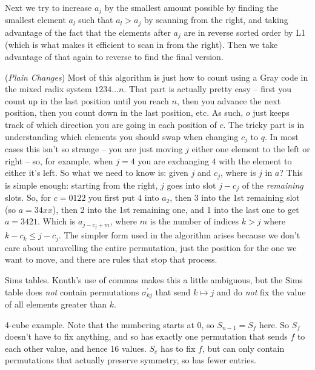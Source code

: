 Next we try to increase $a_j$ by the smallest amount possible by finding
the smallest element $a_l$ such that $a_l > a_j$ by scanning from the right,
and taking advantage of the fact that the elements after $a_j$ are in
reverse sorted order by L1 (which is what makes it efficient to scan
in from the right).  Then we take advantage of that again to reverse to find the
final version.

\vskip 0.08in
 ({\it Plain Changes})\hfil\break
Most of this algorithm is just how to count using a Gray code in the
mixed radix system $1 2 3 4 \ldots n$.  That part is actually pretty easy --
first you count up in the last position until you reach $n$, then you advance
the next position, then you count down in the last position, etc.  As such,
$o$ just keeps track of which direction you are going in each position of $c$.
The tricky part is in understanding which elements you should swap when
changing $c_j$ to $q$.  In most cases this isn't so strange -- you are just
moving $j$ either one element to the left or right -- so, for example, when 
$j = 4$ you are exchanging $4$ with the element to either it's left.  
So what we need to know is: given $j$ and $c_j$, where is $j$ in
$a$?  This is simple enough: starting from the right, $j$ goes into
slot $j - c_{j}$ of the {\it remaining} slots.  So, for $c=0122$
you first put $4$ into $a_2$, then 3 into the 1st remaining slot
(so $a = 34xx$), then 2 into the 1st remaining one, and 1 into
the last one to get $a=3421$.  Which is $a_{j - c_j + m}$,
where $m$ is the number of indices $k > j$ where 
$k - c_k \le j - c_j$.  The simpler form used in the algorithm
arises because we don't care about unravelling the entire
permutation, just the position for the one we want to move,
and there are rules that stop that process.


\noindent [p 327] Sims tables.\hfil\break
Knuth's use of commas makes this a little ambiguous, but the Sims table
does {\it not} contain permutations $\sigma^{\prime}_{kj}$ that send
$k \mapsto j$ and do {\it not} fix the value of all elements greater than $k$.

 4-cube example.\hfil\break
Note that the numbering starts at 0, so $S_{n-1} = S_f$ here.  So $S_f$
doesn't have to fix anything, and so has exactly one permutation that sends
$f$ to each other value, and hence 16 values.  $S_e$ has to fix $f$, but
can only contain permutations that actually preserve symmetry, so has
fewer entries.

